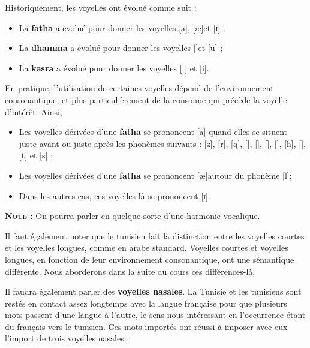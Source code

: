 Historiquement, les voyelles ont évolué comme suit :
\begin{itemize}
    \item La \textbf{fatha} a évolué pour donner les voyelles [a], [\ae]\texttildelow[\textepsilon] et [\textsc{i}] ;
    \item La \textbf{dhamma} a évolué pour donner les voyelles [\textopeno]\texttildelow[\textupsilon] et [u] ;
    \item La \textbf{kasra} a évolué pour donner les voyelles [ \textschwa] et [i].
\end{itemize}

En pratique, l'utilisation de certaines voyelles dépend de l'environnement consonantique, et plus particulièrement de la consonne qui précède la voyelle d'intérêt. Ainsi, 

\begin{itemize}
    \item Les voyelles dérivées d'une \textbf{fatha} se prononcent [a] quand elles se situent juste avant ou juste après les phonèmes suivants :  [z],  [r],  [q],  [\textchi],  [\textinvscr],  [\texthth],  [\textrevglotstop],  [h],  [\dh \super\textrevglotstop],  [t\super\textrevglotstop] et  [s\super\textrevglotstop] ;
    \item Les voyelles dérivées d'une \textbf{fatha} se prononcent [\ae]\texttildelow[\textepsilon] autour du phonème  [l];
    \item Dans les autres cas, ces voyelles là se prononcent [\textsc{i}].
\end{itemize}

\textbf{\textsc{Note} :} On pourra parler en quelque sorte d'une harmonie vocalique.

Il faut également noter que le tunisien fait la distinction entre les voyelles courtes et les voyelles longues, comme en arabe standard. Voyelles courtes et voyelles longues, en fonction de leur environnement consonantique, ont une sémantique différente. Nous aborderons dans la suite du cours ces différences-là.

Il faudra également parler des \textbf{voyelles nasales}. La Tunisie et les tunisiens sont restés en contact assez longtemps avec la langue française pour que plusieurs mots passent d'une langue à l'autre, le sens nous intéressant en l'occurrence étant du français vers le tunisien. Ces mots importés ont réussi à imposer avec eux l'import de trois voyelles nasales : 

